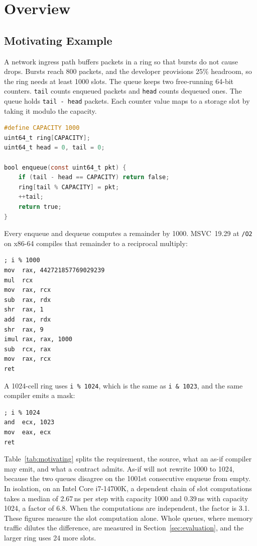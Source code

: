 \section{Overview}
\label{sec:overview}

\subsection{Motivating Example}
\label{sec:motivating_example}

A network ingress path buffers packets in a ring so that bursts do not cause
drops. Bursts reach 800 packets, and the developer provisions 25\% headroom, so
the ring needs at least 1000 slots. The queue keeps two free-running 64-bit
counters. \texttt{tail} counts enqueued packets and \texttt{head} counts
dequeued ones. The queue holds \texttt{tail - head} packets. Each counter value
maps to a storage slot by taking it modulo the capacity.

\begin{lstlisting}[language=C]
#define CAPACITY 1000
uint64_t ring[CAPACITY];
uint64_t head = 0, tail = 0;

bool enqueue(const uint64_t pkt) {
    if (tail - head == CAPACITY) return false;
    ring[tail % CAPACITY] = pkt;
    ++tail;
    return true;
}
\end{lstlisting}

Every enqueue and dequeue computes a remainder by 1000. MSVC~19.29 at
\texttt{/O2} on x86-64 compiles that remainder to a reciprocal multiply:

\begin{lstlisting}[language={[x86masm]Assembler}]
; i % 1000
mov  rax, 442721857769029239
mul  rcx
mov  rax, rcx
sub  rax, rdx
shr  rax, 1
add  rax, rdx
shr  rax, 9
imul rax, rax, 1000
sub  rcx, rax
mov  rax, rcx
ret
\end{lstlisting}

A 1024-cell ring uses \texttt{i \% 1024}, which is the same as
\texttt{i \& 1023}, and the same compiler emits a mask:

\begin{lstlisting}[language={[x86masm]Assembler}]
; i % 1024
and  ecx, 1023
mov  eax, ecx
ret
\end{lstlisting}

Table~\ref{tab:motivating} splits the requirement, the source, what an as-if
compiler may emit, and what a contract admits. As-if will not rewrite 1000 to
1024, because the two queues disagree on the 1001st consecutive enqueue from
empty. In isolation, on an Intel Core i7-14700K, a dependent chain of slot
computations takes a median of 2.67\,ns per step with capacity 1000 and
0.39\,ns with capacity 1024, a factor of 6.8. When the computations are
independent, the factor is 3.1. These figures measure the slot computation
alone. Whole queues, where memory traffic dilutes the difference, are measured
in Section~\ref{sec:evaluation}, and the larger ring uses 24 more slots.

